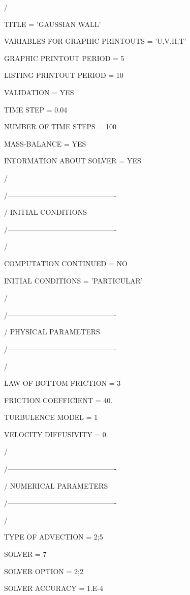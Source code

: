  /

 TITLE                           = 'GAUSSIAN WALL'

 VARIABLES FOR GRAPHIC PRINTOUTS = 'U,V,H,T'

 GRAPHIC PRINTOUT PERIOD         = 5

 LISTING PRINTOUT PERIOD         = 10
                                           
 VALIDATION                      = YES

 TIME STEP                       = 0.04

 NUMBER OF TIME STEPS            = 100

 MASS-BALANCE                    = YES

 INFORMATION ABOUT SOLVER        = YES

 /

 /----------------------------------------------

 / INITIAL CONDITIONS

 /----------------------------------------------

 /

 COMPUTATION CONTINUED           = NO

 INITIAL CONDITIONS              = 'PARTICULAR'

 /

 /----------------------------------------------

 / PHYSICAL PARAMETERS

 /----------------------------------------------

 /

 LAW OF BOTTOM FRICTION          = 3

 FRICTION COEFFICIENT            = 40.

 TURBULENCE MODEL                = 1

 VELOCITY DIFFUSIVITY            = 0.

 /

 /----------------------------------------------

 /  NUMERICAL PARAMETERS

 /----------------------------------------------

 /

 TYPE OF ADVECTION               = 2;5

 SOLVER                          = 7

 SOLVER OPTION                   = 2;2

 SOLVER ACCURACY                 = 1.E-4


